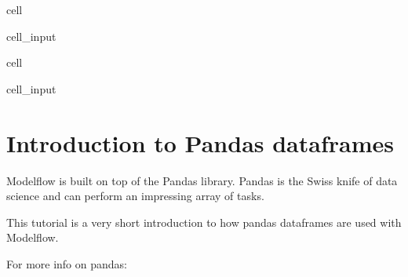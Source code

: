 \documentclass[letterpaper,10pt,english]{jupyterBook}
\begin{document}
\begin{sphinxuseclass}{cell}\begin{sphinxVerbatimInput}

\begin{sphinxuseclass}{cell_input}
\begin{sphinxVerbatim}[commandchars=\\\{\}]
   
   
\end{sphinxVerbatim}

\end{sphinxuseclass}\end{sphinxVerbatimInput}

\end{sphinxuseclass}
\begin{sphinxuseclass}{cell}\begin{sphinxVerbatimInput}

\begin{sphinxuseclass}{cell_input}
\begin{sphinxVerbatim}[commandchars=\\\{\}]
    
\end{sphinxVerbatim}

\end{sphinxuseclass}\end{sphinxVerbatimInput}

\end{sphinxuseclass}
\sphinxstepscope


\chapter{Introduction to Pandas dataframes}
\label{\detokenize{content/notebooks/pandas/dataframes:introduction-to-pandas-dataframes}}\label{\detokenize{content/notebooks/pandas/dataframes::doc}}
\sphinxAtStartPar
Modelflow is built on top of the Pandas library. Pandas is the Swiss knife of data science and can perform an impressing array of tasks.

\sphinxAtStartPar
This tutorial is a very short introduction to how pandas dataframes are used with Modelflow.

\sphinxAtStartPar
For more info on pandas:

\sphinxAtStartPar
{}
\end{document}
